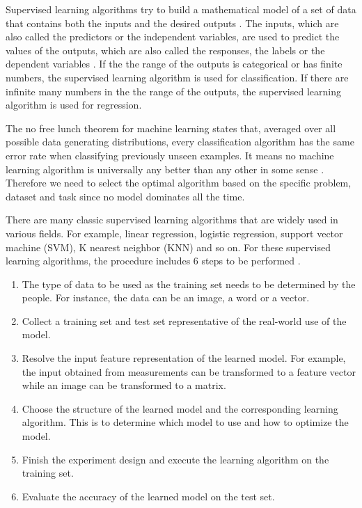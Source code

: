 Supervised learning algorithms try to build a mathematical model of a set of data that contains both the inputs and the desired outputs \cite{russell2010artificial}. The inputs, which are also called the predictors or the independent variables, are used to predict the values of the outputs, which are also called the responses, the labels or the dependent variables \cite{friedman2001elements}. If the the range of the outputs is categorical or has finite numbers, the supervised learning algorithm is used for classification. If there are infinite many numbers in the the range of the outputs, the supervised learning algorithm is used for regression.

The no free lunch theorem \cite{wolpert1996lack} for machine learning states that, averaged over all possible
data generating distributions, every classification algorithm has the same error
rate when classifying previously unseen examples. It means
no machine learning algorithm is universally any better than any other in some sense \cite{goodfellow2016deep}. Therefore we need to select the optimal algorithm based on the specific problem, dataset and task since no model dominates all the time.

There are many classic supervised learning algorithms that are widely used in various fields. For example, linear regression, logistic regression, support vector machine (SVM), K nearest neighbor (KNN) and so on.
For these supervised learning algorithms, the procedure includes 6 steps to be performed  \cite{praveena2017literature}.
\begin{enumerate}
\item The type of data to be used as the training set needs to be determined by the people. For instance, the data can be an image, a word or a vector.
\item Collect a training set and test set representative of the real-world use of the model.
\item Resolve the input feature representation of the learned model. For example, the input obtained from measurements can be transformed to a feature vector while an image can be transformed to a matrix.
\item Choose the structure of the learned model and the corresponding learning algorithm. This is to determine which model to use and how to optimize the model.
\item Finish the experiment design and execute the learning algorithm on the training set.
\item Evaluate the accuracy of the learned model on the test set.
\end{enumerate}

